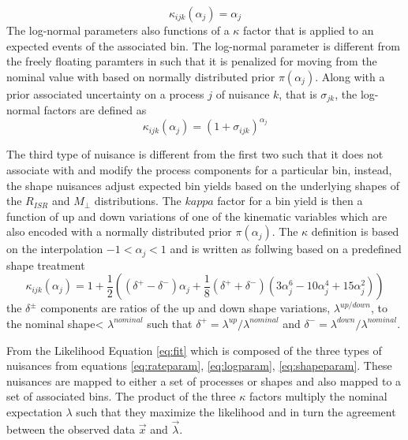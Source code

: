 \begin{equation}
\label{eq:rateparam}
\kappa_{ijk}(\alpha_j) = \alpha_j
\end{equation}  
The log-normal parameters also functions of a $\kappa$ factor that is applied to an expected events of the associated bin. The log-normal parameter is different from the freely floating paramters in such that it is penalized for moving from the nominal value with based on normally distributed prior $\pi(\alpha_j)$. Along with a prior associated uncertainty on a process $j$ of nuisance $k$, that is $\sigma_{jk}$, the log-normal factors are defined as
\begin{equation}
\label{eq:logparam}
\kappa_{ijk}(\alpha_j) = (1+\sigma_{ijk})^{\alpha_j}
\end{equation}

The third type of nuisance is different from the first two such that it does not associate with and modify the process components for a particular bin, instead, the shape nuisances adjust expected bin yields based on the underlying shapes of the $R_{ISR}$ and $M_\perp$ distributions. The $kappa$ factor for a bin yield is then a function of up and down variations of one of the kinematic variables which are also encoded with a normally distributed prior $\pi(\alpha_j)$. The $\kappa$ definition is based on the interpolation $-1<\alpha_j<1$ and is written as follwing based on a predefined shape treatment \cite{combine shapes}
\begin{equation}
\label{eq:shapeparam}
\kappa_{ijk}(\alpha_j)= 1 + \frac{1}{2}((\delta^+ - \delta^-)\alpha_j + \frac{1}{8}(\delta^+ + \delta^-)(3\alpha_j^6-10\alpha_j^4+15\alpha_j^2))
\end{equation}
the $\delta^\pm$ components are ratios of the up and down shape variations, $\lambda^{up/down}$, to the nominal shape< $\lambda^{nominal}$ such that $\delta^+ = \lambda^{up}/\lambda^{nominal}$ and $\delta^- = \lambda^{down}/\lambda^{nominal}.$

From the Likelihood Equation \ref{eq:fit} which is composed of the three types of nuisances from equations \ref{eq:rateparam}, \ref{eq:logparam}, \ref{eq:shapeparam}. These nuisances are mapped to either a set of processes or shapes and also mapped to a set of associated bins. The product of the three $\kappa$ factors multiply the nominal expectation $\lambda$ such that they maximize the likelihood and in turn the agreement between the observed data $\vec{x}$ and $\vec{\lambda}$. 


